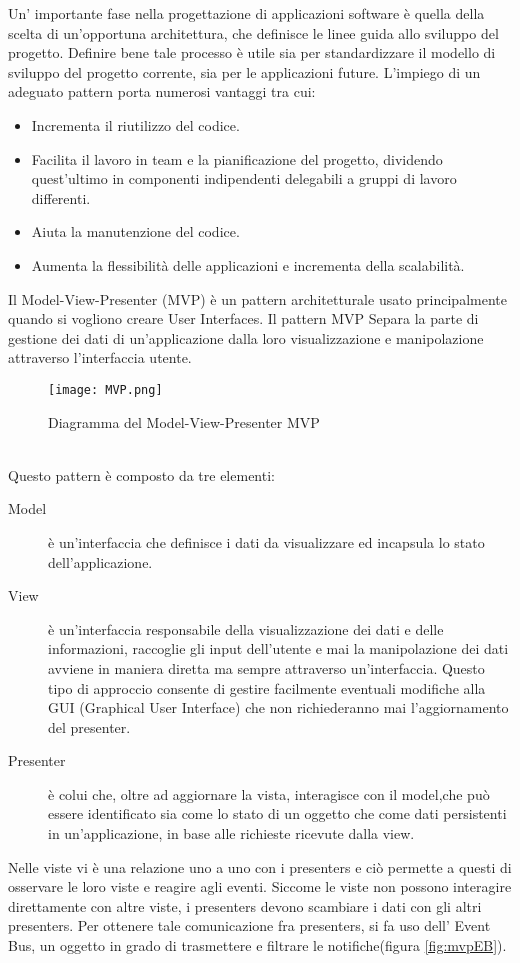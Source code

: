 Un' importante fase nella progettazione di applicazioni software \`e quella della scelta di un'opportuna architettura, che definisce le linee guida allo sviluppo del progetto. Definire bene tale processo \`e utile sia per standardizzare il modello di sviluppo del progetto corrente, sia per le applicazioni
future.
L'impiego di un adeguato pattern porta numerosi vantaggi tra cui:
\begin{itemize}
\item Incrementa il riutilizzo del codice.
\item Facilita il lavoro in team e la pianificazione del progetto, dividendo
quest'ultimo in componenti indipendenti delegabili a gruppi di lavoro
differenti.
\item Aiuta la manutenzione del codice.
\item Aumenta la flessibilit\`a delle applicazioni e incrementa della scalabilit\`a.
\end{itemize}
Il Model-View-Presenter (MVP) \`e un pattern architetturale usato principalmente quando si vogliono creare User Interfaces. 
Il pattern MVP Separa la parte di gestione dei dati di un'applicazione dalla loro visualizzazione e manipolazione attraverso l'interfaccia utente. 
\begin{figure}[htbp]
\centering%
\texttt{[image: MVP.png]}%
\caption{Diagramma del Model-View-Presenter MVP}\label{fig:mvp}%
\end{figure}\\
Questo pattern \`e composto da tre elementi:
\begin{description}
\item[Model] \`e un'interfaccia che definisce i dati da visualizzare ed incapsula lo stato dell'applicazione.
\item[View] \`e un'interfaccia responsabile della visualizzazione dei
dati e delle informazioni, raccoglie gli input dell'utente e mai la manipolazione dei dati avviene in maniera diretta ma sempre attraverso un'interfaccia. Questo tipo di approccio consente di gestire facilmente eventuali modifiche alla GUI (Graphical User Interface) che non richiederanno mai l'aggiornamento del presenter.
\item[Presenter]  \`e colui che, oltre ad aggiornare la vista, interagisce con il model,che pu\`o essere identificato sia come lo stato di un oggetto che come dati persistenti in un'applicazione, in base alle richieste ricevute dalla view.
\end{description}
Nelle viste vi \`e una relazione uno a uno con i presenters e ci\`o permette a questi di osservare le loro viste e reagire agli eventi. Siccome le viste non possono interagire direttamente con altre viste, i presenters devono scambiare i dati con gli altri presenters. Per ottenere tale comunicazione  fra presenters, si fa uso dell' Event Bus, un oggetto in grado di trasmettere e filtrare le notifiche(figura \ref{fig:mvpEB}).
